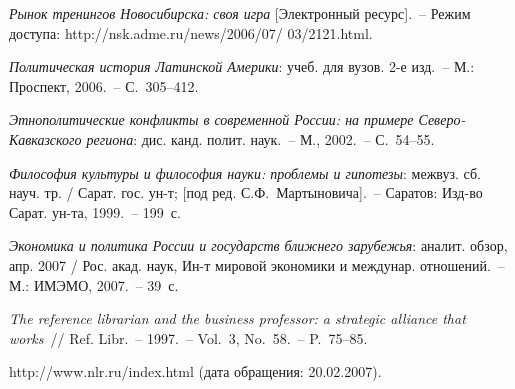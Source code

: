 \documentclass[11pt]{ubs}
\begin{document}
\begin{thebibliography}{10}
\textit{Рынок тренингов Новосибирска: своя игра} [Электронный ресурс].~-- Режим доступа: http://nsk.adme.ru/news/2006/07/ 03/2121.html.

 \textit{Политическая история Латинской Америки}: учеб. для вузов. 2-е изд.~-- М.: Проспект, 2006.~-- С.~305--412.

 \textit{Этнополитические конфликты в современной России: на примере Северо-Кавказского региона}: дис. канд. полит. наук.~-- М., 2002.~-- С.~54--55.

\textit{Философия культуры и философия науки: проблемы и гипотезы}: межвуз. сб. науч. тр. / Сарат. гос. ун-т; [под ред. С.Ф.~Мартыновича].~-- Саратов: Изд-во Сарат. ун-та, 1999.~-- 199~с.

\textit{Экономика и политика России и государств ближнего зарубежья}: аналит. обзор, апр. 2007 / Рос. акад. наук, Ин-т мировой экономики и междунар. отношений.~-- М.: ИМЭМО, 2007.~-- 39~с.

 \textit{The reference librarian and the business professor: a strategic alliance that works}~// Ref. Libr.~-- 1997.~-- Vol.~3, No.~58.~-- P.~75--85.

http://www.nlr.ru/index.html (дата обращения: 20.02.2007).

\end{thebibliography}

\makeenginfo
\makeauxinfo
\end{document}
